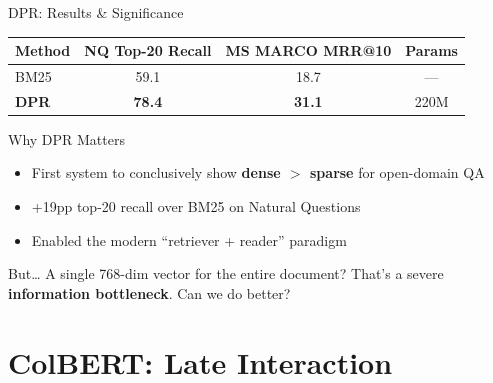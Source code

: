 \documentclass[aspectratio=169]{beamer}
\newif\ifanimated
\newcommand{\cpause}{\ifanimated\pause\fi}
\begin{document}
\begin{frame}{DPR: Results \& Significance}
\begin{center}
\begin{tabular}{lccc}
\toprule
\textbf{Method} & \textbf{NQ Top-20 Recall} & \textbf{MS MARCO MRR@10} & \textbf{Params} \\
\midrule
BM25 & 59.1 & 18.7 & --- \\
\textbf{DPR} & \textbf{78.4} & \textbf{31.1} & 220M \\
\bottomrule
\end{tabular}
\end{center}

\vspace{0.5em}

\begin{block}{Why DPR Matters}
\begin{itemize}
    \item First system to conclusively show \textbf{dense $>$ sparse} for open-domain QA
    \item +19pp top-20 recall over BM25 on Natural Questions
    \item Enabled the modern ``retriever + reader'' paradigm
\end{itemize}\cpause
\end{block}

\cpause
\vspace{0.5em}

\begin{alertblock}{But\ldots}
A single 768-dim vector for the entire document? That's a severe \textbf{information bottleneck}. Can we do better?
\end{alertblock}
\end{frame}

\section{ColBERT: Late Interaction}

\begin{frame}[plain]
\sectionpage
\end{frame}
\end{document}
